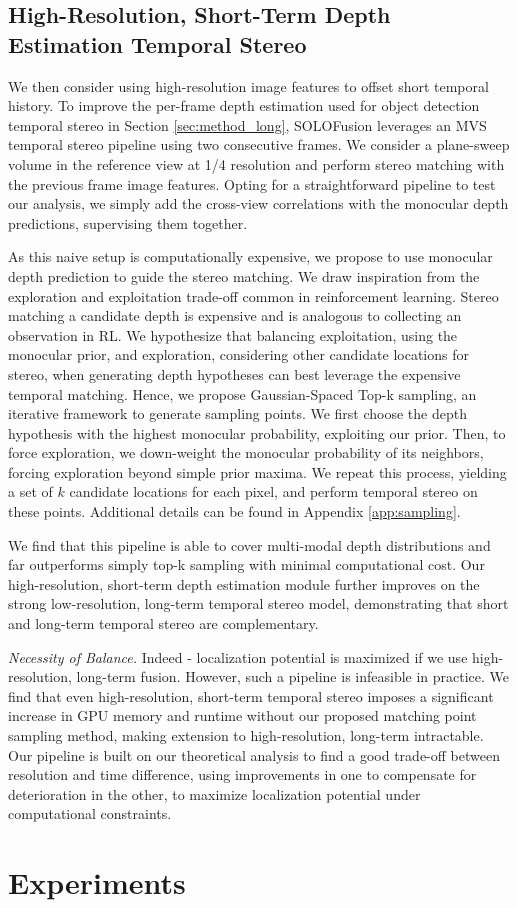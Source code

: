 \documentclass[runningheads, hyperfootnotes=false]{article}
\begin{document}
\subsection{High-Resolution, Short-Term Depth Estimation Temporal Stereo}\label{sec:method_short}
We then consider using high-resolution image features to offset short temporal history. To improve the per-frame depth estimation used for object detection temporal stereo in Section \ref{sec:method_long}, SOLOFusion leverages an MVS temporal stereo pipeline using two consecutive frames. We consider a plane-sweep volume in the reference view at 1/4 resolution and perform stereo matching with the previous frame image features. Opting for a straightforward pipeline to test our analysis, we simply add the cross-view correlations with the monocular depth predictions, supervising them together.

As this naive setup is computationally expensive, we propose to use monocular depth prediction to guide the stereo matching. We draw inspiration from the exploration and exploitation trade-off common in reinforcement learning. Stereo matching a candidate depth is expensive and is analogous to collecting an observation in RL. We hypothesize that balancing exploitation, using the monocular prior, and exploration, considering other candidate locations for stereo, when generating depth hypotheses can best leverage the expensive temporal matching. Hence, we propose Gaussian-Spaced Top-k sampling, an iterative framework to generate sampling points. We first choose the depth hypothesis with the highest monocular probability, exploiting our prior. Then, to force exploration, we down-weight the monocular probability of its neighbors, forcing exploration beyond simple prior maxima. We repeat this process, yielding a set of $k$ candidate locations for each pixel, and perform temporal stereo on these points. Additional details can be found in Appendix \ref{app:sampling}.

We find that this pipeline is able to cover multi-modal depth distributions and far outperforms simply top-k sampling with minimal computational cost. Our high-resolution, short-term depth estimation module further improves on the strong low-resolution, long-term temporal stereo model, demonstrating that short and long-term temporal stereo are complementary.

\noindent\textit{Necessity of Balance.}
Indeed - localization potential is maximized if we use high-resolution, long-term fusion. However, such a pipeline is infeasible in practice. We find that even high-resolution, short-term temporal stereo imposes a significant increase in GPU memory and runtime without our proposed matching point sampling method, making extension to high-resolution, long-term intractable. Our pipeline is built on our theoretical analysis to find a good trade-off between resolution and time difference, using improvements in one to compensate for deterioration in the other, to maximize localization potential under computational constraints.  \section{Experiments}
\end{document}
